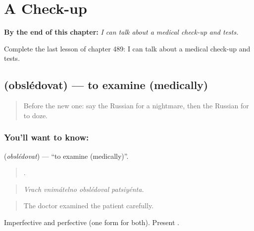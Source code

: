 
\chapter{A Check-up}
\label{ch:ru-a-check-up}

\begin{chapteropening}
\textbf{By the end of this chapter:} \emph{I can talk about a medical check-up and tests.}

Complete the last lesson of chapter 489: I can talk about a medical check-up and tests.
\end{chapteropening}

\section[\texorpdfstring{\ru{обследовать} (obslédovat)}{обследовать (obslédovat)}]{ (obslédovat) — to examine (medically)}

\label{lesson:RU-C489-obsledovat}



\begin{quote}
Before the new one: say the Russian for a nightmare, then the Russian for to doze.
\end{quote}

\subsection*{You'll want to know: }
\textbf{} (\emph{obslédovat}) — \textquotedblleft{}to examine (medically)\textquotedblright{}.

\begin{quote}
   .
\end{quote}

\begin{quote}
\emph{Vrach vnimátelno obslédoval patsiyénta.}
\end{quote}

\begin{quote}
The doctor examined the patient carefully.
\end{quote}

Imperfective and perfective (one form for both). Present .

